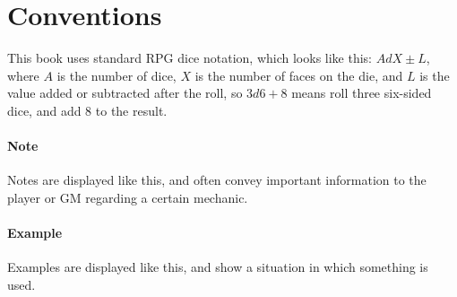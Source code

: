 \documentclass[a4paper]{book}
\begin{document}
\section*{Conventions}
This book uses standard RPG dice notation, which looks like this: $AdX\pm L$, where $A$ is the number of dice, $X$ is the number of faces on the die, and $L$ is the value added or subtracted after the roll, so $3d6+8$ means roll three six-sided dice, and add 8 to the result.
\paragraph{Note} Notes are displayed like this, and often convey important information to the player or GM regarding a certain mechanic.
\paragraph{Example} Examples are displayed like this, and show a situation in which something is used.

\tableofcontents











\end{document}
